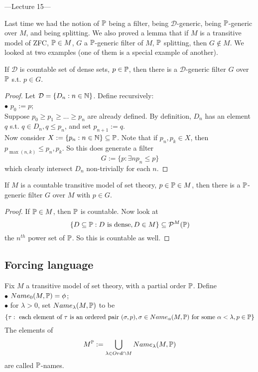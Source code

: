 \documentclass[a4paper]{article}
\begin{document}
---Lecture 15---

Last time we had the notion of $\P$ being a filter, being $\mathcal{D}$-generic, being $\P$-generic over $M$, and being splitting. We also proved a lemma that if $M$ is a transitive model of ZFC, $\P \in M$, $G$ a $\P$-generic filter of $M$, $\P$ splitting, then $G \not\in M$. We looked at two examples (one of them is a special example of another).

\begin{lemma}
If $\mathcal{D}$ is countable set of dense sets, $p \in \P$, then there is a $\mathcal{D}$-generic filter $G$ over $\P$ s.t. $p \in G$.
\begin{proof}
Let $\mathcal{D} = \{D_n:n \in \N\}$. Define recursively:\\
$\bullet$ $p_0:=p$;\\
Suppose $p_0 \geq p_1 \geq ... \geq p_n$ are already defined. By definition, $D_n$ has an element $q$ s.t. $q \in D_n, q \leq p_n$, and set $p_{n+1}:=q$.\\
Now consider $X := \{p_n:n \in \N\} \subseteq \P$. Note that if $p_n,p_k \in X$, then $p_{\max(n,k)} \leq p_n,p_k$. So this does generate a filter
\[
G:=\{p: \exists n p_n \leq p\}
\]
which clearly intersect $D_n$ non-trivially for each $n$.
\end{proof}
\end{lemma}

\begin{coro}
If $M$ is a countable transitive model of set theory, $p \in \P \in M$, then there is a $\P$-generic filter $G$ over $M$ with $p \in G$.
\begin{proof}
If $\P \in M$, then $\P$ is countable. Now look at
\[
\{D \subseteq \P: D \text{ is dense}, D \in M\} \subseteq \mathcal{P}^M(\P)
\]
the $n^{th}$ power set of $\P$. So this is countable as well.
\end{proof}
\end{coro}

\subsection{Forcing language}

Fix $M$ a transitive model of set theory, with a partial order $\P$. Define\\
$\bullet$ $Name_0(M,\P) = \phi$;\\
$\bullet$ for $\lambda >0$, set $Name_\lambda(M,\P)$ to be 
\[
\{\tau: \text{ each element of } \tau \text{ is an ordered pair } (\sigma,p), \sigma \in Name_\alpha(M,\P) \text{ for some } \alpha < \lambda, p \in \P\}
\]
The elements of 
\[
M^\P:=\bigcup_{\lambda \in Ord \cap M} Name_\lambda(M,\P)
\]
are called $\P$-names.
\end{document}
